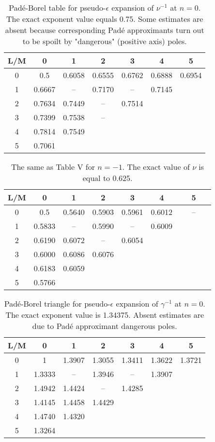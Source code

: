 \documentclass[preprint,preprintnumbers,amsmath,amssymb]{revtex4}
\begin{document}
\begin{table}[t]
\caption{Pad\'e-Borel table for pseudo-$\epsilon$ expansion of $\nu^{-1}$ at $n = 0$.
The exact exponent value equals 0.75. Some estimates are absent because corresponding
Pad\'e approximants turn out to be spoilt by "dangerous" (positive axis) poles.}
\label{tab5}
\renewcommand{\tabcolsep}{0.4cm}
\begin{tabular}{|*{7}{c|}}\hline
L/M& 0& 1 & 2 & 3 & 4 & 5\\ \hline
0 & 0.5 & 0.6058 & 0.6555 & 0.6762 & 0.6888 & 0.6954 \\ \hline
1 & 0.6667 & -- & 0.7170 & -- & 0.7145 & \\ \hline
2 & 0.7634 & 0.7449 & -- & 0.7514& & \\ \hline
3 & 0.7399 & 0.7538 & -- & & & \\ \hline
4 & 0.7814 & 0.7549 & & & & \\ \hline
5 & 0.7061 & & & & & \\ \hline
\end{tabular}
\end{table}

\begin{table}[t]
\caption{The same as Table V for $n = -1$. The exact value of $\nu$ is equal to 0.625.}
\label{tab6}
\renewcommand{\tabcolsep}{0.4cm}
\begin{tabular}{|*{7}{c|}}\hline
L/M & 0 & 1 & 2 & 3 & 4 & 5\\ \hline
0 & 0.5 & 0.5640 & 0.5903 & 0.5961 & 0.6012 & ~~~--~~~ \\ \hline
1 & 0.5833 & -- & 0.5990 & -- & 0.6009 & \\ \hline
2 & 0.6190 & 0.6072 & -- & 0.6054 & & \\ \hline
3 & 0.6000 & 0.6086 & 0.6076 & & & \\ \hline
4 & 0.6183 & 0.6059 & & & & \\ \hline
5 & 0.5766 & & & & & \\ \hline
\end{tabular}
\end{table}

\begin{table}[t]
\caption{Pad\'e-Borel triangle for pseudo-$\epsilon$ expansion of $\gamma^{-1}$ at $n = 0$.
The exact exponent value is 1.34375. Absent estimates are due to Pad\'e approximant
dangerous poles.}
\label{tab7}
\renewcommand{\tabcolsep}{0.4cm}
\begin{tabular}{|*{7}{c|}}\hline
L/M & 0 & 1 & 2 & 3 & 4 & 5 \\ \hline
0 & 1 & 1.3907 & 1.3055 & 1.3411 & 1.3622 & 1.3721 \\ \hline
1 & 1.3333 & -- & 1.3946 & -- & 1.3907 & \\ \hline
2 & 1.4942 & 1.4424 & -- & 1.4285 & & \\ \hline
3 & 1.4145 & 1.4458 & 1.4429 & & & \\ \hline
4 & 1.4740 & 1.4320 & & & & \\ \hline
5 & 1.3264 & & & & & \\ \hline
\end{tabular}
\end{table}
\end{document}
